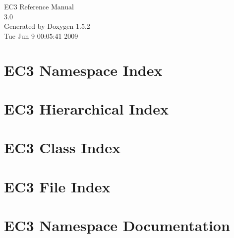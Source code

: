 \documentclass[a4paper]{book}
\begin{document}
\begin{titlepage}
\vspace*{7cm}
\begin{center}
{\Large EC3 Reference Manual\\[1ex]\large 3.0 }\\
\vspace*{1cm}
{\large Generated by Doxygen 1.5.2}\\
\vspace*{0.5cm}
{\small Tue Jun 9 00:05:41 2009}\\
\end{center}
\end{titlepage}
\clearemptydoublepage
{}
\tableofcontents
\clearemptydoublepage
{}
\chapter{EC3 Namespace Index}

\chapter{EC3 Hierarchical Index}

\chapter{EC3 Class Index}

\chapter{EC3 File Index}

\chapter{EC3 Namespace Documentation}



\end{document}
